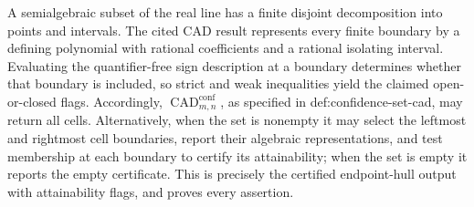 A semialgebraic subset of the real line has a finite disjoint decomposition into points and intervals.  The cited CAD result represents every finite boundary by a defining polynomial with rational coefficients and a rational isolating interval.  Evaluating the quantifier-free sign description at a boundary determines whether that boundary is included, so strict and weak inequalities yield the claimed open-or-closed flags.  Accordingly, \(\operatorname{CAD}^{\mathrm{conf}}_{m,n}\), as specified in def:confidence-set-cad, may return all cells.  Alternatively, when the set is nonempty it may select the leftmost and rightmost cell boundaries, report their algebraic representations, and test membership at each boundary to certify its attainability; when the set is empty it reports the empty certificate.  This is precisely the certified endpoint-hull output with attainability flags, and proves every assertion.
